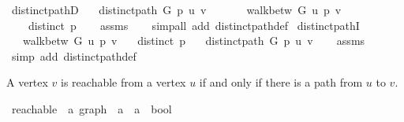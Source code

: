 \begin{isabellebody}
\ distinct{\isacharunderscore}{\kern0pt}pathD{\isacharcolon}{\kern0pt}\isanewline
\ \ \ {\isachardoublequoteopen}distinct{\isacharunderscore}{\kern0pt}path\ G\ p\ u\ v{\isachardoublequoteclose}\isanewline
\ \ \isanewline
\ \ \ \ {\isachardoublequoteopen}walk{\isacharunderscore}{\kern0pt}betw\ G\ u\ p\ v{\isachardoublequoteclose}\isanewline
\ \ \ \ {\isachardoublequoteopen}distinct\ p{\isachardoublequoteclose}%
\endisataginvisible
{\isafoldinvisible}%
%
\isadeliminvisible
%
\endisadeliminvisible
\isanewline
%
\isadelimproof
\ \ %
\endisadelimproof
%
\isatagproof
{}\isamarkupfalse%
\ assms\isanewline
\ \ \isamarkupfalse%
\ {\isacharparenleft}{\kern0pt}simp{\isacharunderscore}{\kern0pt}all\ add{\isacharcolon}{\kern0pt}\ distinct{\isacharunderscore}{\kern0pt}path{\isacharunderscore}{\kern0pt}def{\isacharparenright}{\kern0pt}%
\endisatagproof
{\isafoldproof}%
%
\isadelimproof
%
\endisadelimproof
\isanewline
%
\isadeliminvisible
\isanewline
%
\endisadeliminvisible
%
\isataginvisible
{}\isamarkupfalse%
\ distinct{\isacharunderscore}{\kern0pt}pathI{\isacharcolon}{\kern0pt}\isanewline
\ \ \ {\isachardoublequoteopen}walk{\isacharunderscore}{\kern0pt}betw\ G\ u\ p\ v{\isachardoublequoteclose}\isanewline
\ \ \ {\isachardoublequoteopen}distinct\ p{\isachardoublequoteclose}\isanewline
\ \ \ {\isachardoublequoteopen}distinct{\isacharunderscore}{\kern0pt}path\ G\ p\ u\ v{\isachardoublequoteclose}%
\endisataginvisible
{\isafoldinvisible}%
%
\isadeliminvisible
%
\endisadeliminvisible
\isanewline
%
\isadelimproof
\ \ %
\endisadelimproof
%
\isatagproof
{}\isamarkupfalse%
\ assms\isanewline
\ \ \isamarkupfalse%
\ {\isacharparenleft}{\kern0pt}simp\ add{\isacharcolon}{\kern0pt}\ distinct{\isacharunderscore}{\kern0pt}path{\isacharunderscore}{\kern0pt}def{\isacharparenright}{\kern0pt}%
\endisatagproof
{\isafoldproof}%
%
\isadelimproof
%
\endisadelimproof
%
\begin{isamarkuptext}%
A vertex $v$ is reachable from a vertex $u$ if and only if there is a path from $u$ to $v$.%
\end{isamarkuptext}\isamarkuptrue%
\isamarkupfalse%
\ reachable\ {\isacharcolon}{\kern0pt}{\isacharcolon}{\kern0pt}\ {\isachardoublequoteopen}{\isacharprime}{\kern0pt}a\ graph\ {\isasymRightarrow}\ {\isacharprime}{\kern0pt}a\ {\isasymRightarrow}\ {\isacharprime}{\kern0pt}a\ {\isasymRightarrow}\ bool{\isachardoublequoteclose}\ \isanewline

\end{isabellebody}
